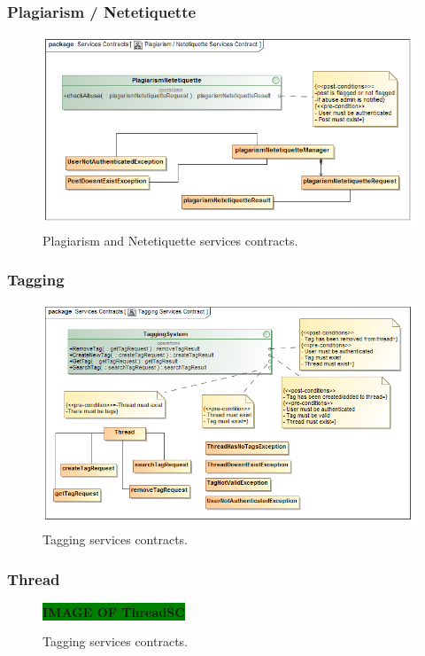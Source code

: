 \documentclass [a4paper,12pt] {article}
\begin{document}
		\subsubsection{Plagiarism / Netetiquette}
			\begin{figure}[H]
				\centering
				\includegraphics[width=1.0\textwidth]{PlagiarismNetetiquetteSC.png}
				\caption{Plagiarism and Netetiquette services contracts.}
			\end{figure}
		\subsubsection{Tagging}
			\begin{figure}[H]
				\centering
				\includegraphics[width=1.0\textwidth]{TaggingSC.png}
				\caption{Tagging services contracts.}
			\end{figure}
		\subsubsection{Thread}
			\begin{figure}[H]
				\centering
				\large\textbf{\colorbox{green}{IMAGE OF ThreadSC}}
				\caption{Tagging services contracts.}
			\end{figure}	
\end{document}
